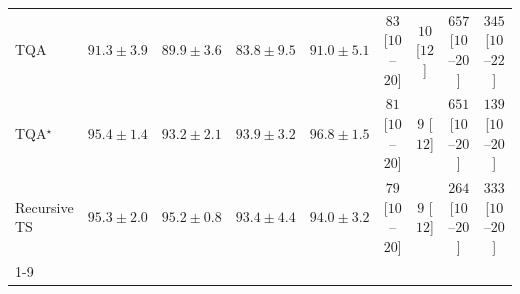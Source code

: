 \begin{tabular}{l|cccc|cccc|}
TQA & {\cellcolor[HTML]{2F8BBE}} \color[HTML]{F1F1F1} $91.3\pm 3.9$ & {\cellcolor[HTML]{4C99C5}} \color[HTML]{F1F1F1} $89.9\pm 3.6$ & {\cellcolor[HTML]{C1CAE2}} \color[HTML]{000000} $83.8\pm 9.5$ & {\cellcolor[HTML]{348EBF}} \color[HTML]{F1F1F1} $91.0\pm 5.1$ & {\cellcolor[HTML]{FDE3E0}} \color[HTML]{000000} $83$ [$10$--$20$] & {\cellcolor[HTML]{FFF7F3}} \color[HTML]{000000} $10$ [$12$] & {\cellcolor[HTML]{4E006B}} \color[HTML]{F1F1F1} $657$ [$10$--$20$] & {\cellcolor[HTML]{F462A0}} \color[HTML]{F1F1F1} $345$ [$10$--$22$] \\
TQA$^\star$ & {\cellcolor[HTML]{046198}} \color[HTML]{F1F1F1} $95.4\pm 1.4$ & {\cellcolor[HTML]{0C74B2}} \color[HTML]{F1F1F1} $93.2\pm 2.1$ & {\cellcolor[HTML]{056DAC}} \color[HTML]{F1F1F1} $93.9\pm 3.2$ & {\cellcolor[HTML]{045483}} \color[HTML]{F1F1F1} $96.8\pm 1.5$ & {\cellcolor[HTML]{FDE3E0}} \color[HTML]{000000} $81$ [$10$--$20$] & {\cellcolor[HTML]{FFF7F3}} \color[HTML]{000000} $9$ [$12$] & {\cellcolor[HTML]{51006C}} \color[HTML]{F1F1F1} $651$ [$10$--$20$] & {\cellcolor[HTML]{FCD1CD}} \color[HTML]{000000} $139$ [$10$--$20$] \\
Recursive TS & {\cellcolor[HTML]{046299}} \color[HTML]{F1F1F1} $95.3\pm 2.0$ & {\cellcolor[HTML]{04639B}} \color[HTML]{F1F1F1} $95.2\pm 0.8$ & {\cellcolor[HTML]{0872B1}} \color[HTML]{F1F1F1} $93.4\pm 4.4$ & {\cellcolor[HTML]{056DAB}} \color[HTML]{F1F1F1} $94.0\pm 3.2$ & {\cellcolor[HTML]{FDE4E0}} \color[HTML]{000000} $79$ [$10$--$20$] & {\cellcolor[HTML]{FFF7F3}} \color[HTML]{000000} $9$ [$12$] & {\cellcolor[HTML]{FA99B3}} \color[HTML]{000000} $264$ [$10$--$20$] & {\cellcolor[HTML]{F76BA2}} \color[HTML]{F1F1F1} $333$ [$10$--$20$] \\
\cline{1-9}
\bottomrule
\end{tabular}

